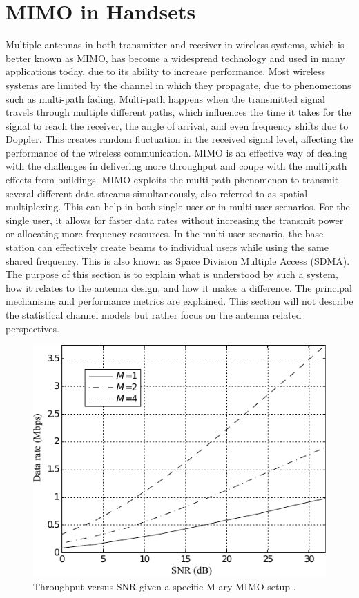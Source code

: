 \section{MIMO in Handsets}
\label{sec:mimo_in_handsets}
\begin{aautop}
Multiple antennas in both transmitter and receiver in wireless systems, which is better known as MIMO, has become a widespread technology and used in many applications today, due to its ability to increase performance. Most wireless systems are limited by the channel in which they propagate, due to phenomenons such as multi-path fading. Multi-path happens when the transmitted signal travels through multiple different paths, which influences the time it takes for the signal to reach the receiver, the angle of arrival, and even frequency shifts due to Doppler. This creates random fluctuation in the received signal level, affecting the performance of the wireless communication. MIMO is an effective way of dealing with the challenges in delivering more throughput and coupe with the multipath effects from buildings. MIMO exploits the multi-path phenomenon to transmit several different data streams simultaneously, also referred to as spatial multiplexing. This can help in both single user or in multi-user scenarios. For the single user, it allows for faster data rates without increasing the transmit power or allocating more frequency resources. In the multi-user scenario, the base station can effectively create beams to individual users while using the same shared frequency. This is also known as Space Division Multiple Access (SDMA). The purpose of this section is to explain what is understood by such a system, how it relates to the antenna design, and how it makes a difference. The principal mechanisms and performance metrics are explained. This section will not describe the statistical channel models but rather focus on the antenna related perspectives.
\end{aautop}

\begin{figure}[htbp]
  \centering
  \includegraphics[scale=1.2]{img/analysis/datarateMimo}
  \caption{Throughput versus SNR given a specific M-ary MIMO-setup \cite{Ezio2007MIMO}.}
  \label{fig:mimo-throughput}
\end{figure}

